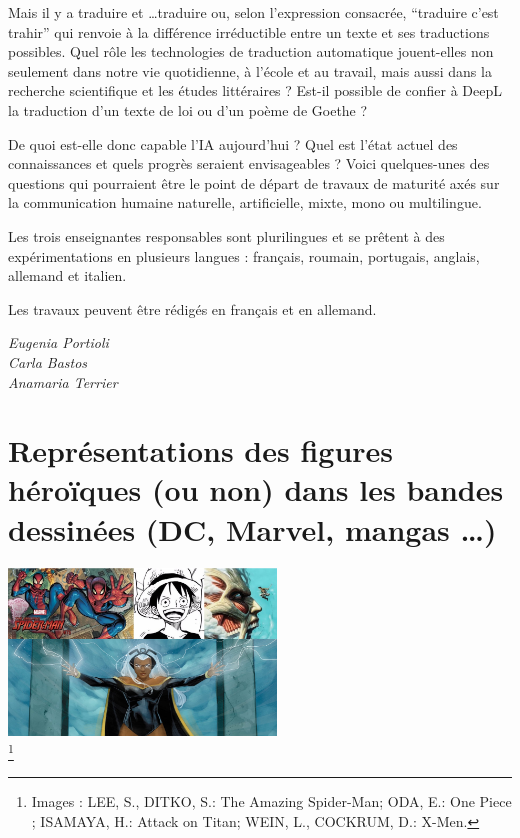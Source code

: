 \documentclass[
  10pt,
  french,
  a5paper,
  openany]{book}
\newenvironment{signature}{\begin{flushright}}{\end{flushright}}
\begin{document}
Mais il y a traduire et \ldots traduire ou, selon l'expression consacrée, ``traduire c'est trahir'' qui renvoie à la différence irréductible entre un texte et ses traductions possibles. Quel rôle les technologies de traduction automatique jouent-elles non seulement dans notre vie quotidienne, à l'école et au travail, mais aussi dans la recherche scientifique et les études littéraires ? Est-il possible de confier à DeepL la traduction d'un texte de loi ou d'un poème de Goethe ?

De quoi est-elle donc capable l'IA aujourd'hui ? Quel est l'état actuel des connaissances et quels progrès seraient envisageables ? Voici quelques-unes des questions qui pourraient être le point de départ de travaux de maturité axés sur la communication humaine naturelle, artificielle, mixte, mono ou multilingue.

Les trois enseignantes responsables sont plurilingues et se prêtent à des expérimentations en plusieurs langues : français, roumain, portugais, anglais, allemand et italien.

Les travaux peuvent être rédigés en français et en allemand.

\begin{signature}
\emph{Eugenia Portioli}\\
\emph{Carla Bastos}\\
\emph{Anamaria Terrier}

\end{signature}

\hypertarget{repruxe9sentations-des-figures-huxe9rouxefques-ou-non-dans-les-bandes-dessinuxe9es-dc-marvel-mangas}{%
\chapter{\texorpdfstring{Représentations des figures héroïques \linebreak (ou non) dans les bandes dessinées \linebreak (DC, Marvel, mangas \ldots)}{Représentations des figures héroïques (ou non) dans les bandes dessinées (DC, Marvel, mangas \ldots)}}\label{repruxe9sentations-des-figures-huxe9rouxefques-ou-non-dans-les-bandes-dessinuxe9es-dc-marvel-mangas}}

\begin{center}
\includegraphics[width=\textwidth,height=12em]{images/representations-des-figures-heroiques.jpg}\\
\footnote{Images : LEE, S., DITKO, S.: The Amazing Spider-Man; ODA, E.: One Piece ; ISAMAYA, H.: Attack on Titan; WEIN, L., COCKRUM, D.: X-Men.}

\end{center}
\end{document}
